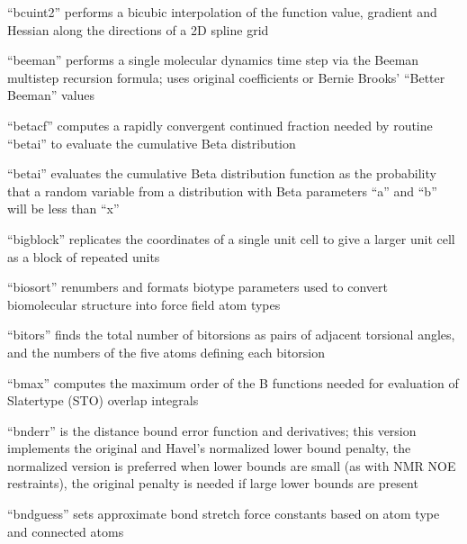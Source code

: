 \documentclass[letterpaper,11pt,english]{sphinxmanual}
\begin{document}

“bcuint2” performs a bicubic interpolation of the function value,
gradient and Hessian along the directions of a 2D spline grid


“beeman” performs a single molecular dynamics time step
via the Beeman multistep recursion formula; uses original
coefficients or Bernie Brooks’ “Better Beeman” values


“betacf” computes a rapidly convergent continued fraction needed
by routine “betai” to evaluate the cumulative Beta distribution


“betai” evaluates the cumulative Beta distribution function
as the probability that a random variable from a distribution
with Beta parameters “a” and “b” will be less than “x”


“bigblock” replicates the coordinates of a single unit cell
to give a larger unit cell as a block of repeated units


“biosort” renumbers and formats biotype parameters used to
convert biomolecular structure into force field atom types


“bitors” finds the total number of bitorsions as pairs
of adjacent torsional angles, and the numbers of the five
atoms defining each bitorsion


“bmax” computes the maximum order of the B functions needed
for evaluation of Slater\sphinxhyphen{}type (STO) overlap integrals


“bnderr” is the distance bound error function and derivatives;
this version implements the original and Havel’s normalized
lower bound penalty, the normalized version is preferred when
lower bounds are small (as with NMR NOE restraints), the
original penalty is needed if large lower bounds are present


“bndguess” sets approximate bond stretch force constants based
on atom type and connected atoms
\end{document}
